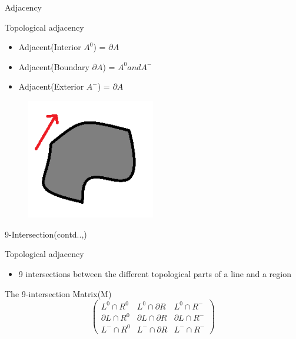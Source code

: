 \begin{frame}{Adjacency}
	\begin{block}{Topological adjacency}
	\begin{itemize}
	\item Adjacent(Interior {$A^0$}) = $\partial A$
	\item Adjacent(Boundary {$\partial A$}) = $A^0 and A^-$
	\item Adjacent(Exterior {$A^-$}) = $\partial A$
	\end{itemize}
	\begin{figure}
	\includegraphics[width = 0.5\textwidth]{images/exterior.png}
	\end{figure}
\end{block}		
\end{frame}

\begin{frame}{9-Intersection(contd..,)}
	\begin{block}{Topological adjacency}
	\begin{itemize}
	\item 9 intersections between the different topological parts of a line and a region
	\end{itemize}
\end{block}		
\begin{block}{The 9-intersection Matrix(M)}
\[ \left( \begin{array}{ccc}
L^0 \cap R^0  & L^0 \cap \partial R & L^0 \cap R^- \\
\partial L \cap R^0 & \partial L \cap \partial R & \partial L \cap R^- \\
L^- \cap R^0 & L^- \cap \partial R & L^- \cap R^- \end{array} \right)\] 
\end{block}
\end{frame}

